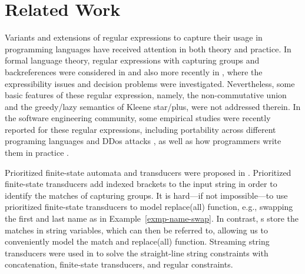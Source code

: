 \section{Related Work}
\label{sec-related}



{}
%
Variants and extensions of regular expressions to capture their usage in programming languages have received attention %
in both theory and practice. In formal language theory, regular expressions with capturing groups and backreferences were considered in \cite{CSY03,CN09} and also more recently in \cite{Freydenberger13,Schmid16,BM17b,FS19}, where the expressibility issues and decision problems were investigated. Nevertheless, some basic features of these regular expression, namely, the non-commutative union and the greedy/lazy semantics of Kleene star/plus, were not addressed therein. In the software engineering community, %
some empirical studies were recently reported for these regular expressions, including portability across different programing languages \cite{DMC+19} and DDos attacks \cite{SP18}, as well as how programmers write them in practice \cite{MDD+19}.


Prioritized finite-state automata and %
transducers were proposed in \cite{BM17}. Prioritized finite-state transducers add indexed brackets to the input string in order to identify the matches of capturing groups. It is hard---if not impossible---to use prioritized finite-state transducers to model replace(all) function, e.g., swapping the first and last name as in Example~\ref{exmp-name-swap}. In contrast, {\PSST}s store the matches in string variables, which can then be referred to, allowing us to conveniently model the match and replace(all) function. 
%
Streaming string transducers were used in \cite{ZAM19} to solve the straight-line string constraints with concatenation, finite-state transducers, and regular constraints.

